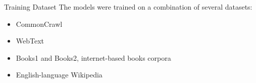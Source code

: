 \documentclass{beamer}
\begin{document}
\begin{frame}{Training Dataset}
    The models were trained on a combination of several datasets:
    \begin{itemize}
        \item CommonCrawl
        \item WebText
        \item Books1 and Books2, internet-based books corpora
        \item English-language Wikipedia
    \end{itemize}
\end{frame}
\end{document}
